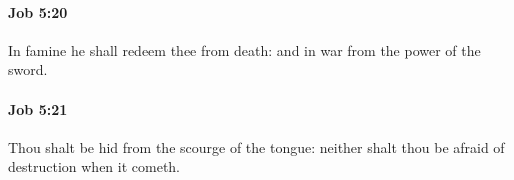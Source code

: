 		\paragraph{Job 5:20} %
			\label{JOB-5-20}

			In famine he shall redeem thee from death: and in war from the power of the sword.


		\paragraph{Job 5:21} %
			\label{JOB-5-21}

			Thou shalt be hid from the scourge of the tongue: neither shalt thou be afraid of destruction when it cometh.



